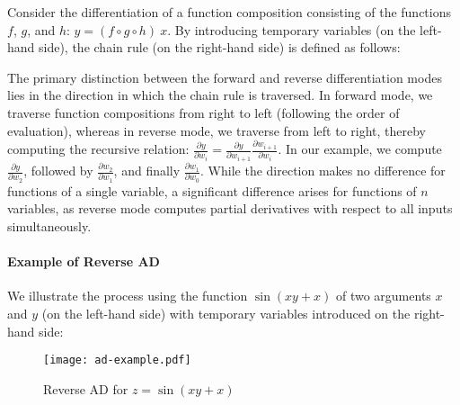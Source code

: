 Consider the differentiation of a function composition consisting of the
functions \(f\), \(g\), and \(h\):
\(
y = (f \circ g \circ h)\ x.
\)
By introducing temporary variables (on the left-hand side), the
chain rule (on the right-hand side) is defined as follows:
The primary distinction between the forward and reverse differentiation modes
lies in the direction in which the chain rule is traversed. In forward mode, we
traverse function compositions from right to left (following the order of
evaluation), whereas in reverse mode, we traverse from left to right, thereby
computing the recursive relation:
\(
\frac{\partial y}{\partial w_i} = \frac{\partial y}{\partial w_{i+1}} \frac{\partial w_{i+1}}{\partial w_i}.
\)
In our example, we compute \(\frac{\partial y}{\partial w_2}\), followed by
\(\frac{\partial w_2}{\partial w_1}\), and finally \(\frac{\partial
w_1}{\partial w_0}\). While the direction makes no difference for functions of
a single variable, a significant difference arises for functions of \(n\)
variables, as reverse mode computes partial derivatives with respect to all inputs
simultaneously.

\paragraph{Example of Reverse AD}
We illustrate the process using the function \(\sin(xy + x)\) of two arguments \(x\)
and \(y\)
(on the left-hand side) with temporary variables introduced on the right-hand side:

\begin{wrapfigure}{r}{.6\linewidth}
  \texttt{[image: ad-example.pdf]}
  \caption{\label{fig:ad-graph}Reverse AD for \(z = \sin(xy+x)\)}
\end{wrapfigure}

